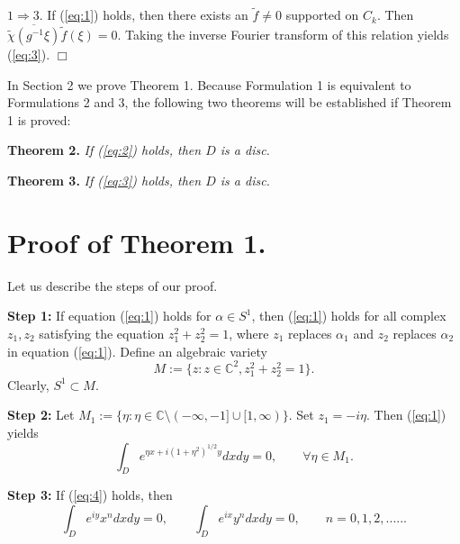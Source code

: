 \documentclass[final,11pt]{article}
\def\C{\mathbb{C}}
\begin{document}
$1\Rightarrow 3.$ If (\ref{eq:1}) holds, then there exists an
$\tilde{f}\neq 0$ supported on $C_k$. Then
$\overline{\tilde{\chi}(g^{-1}\xi)}\tilde{f}(\xi)=0$. Taking the inverse
Fourier transform of this relation yields (\ref{eq:3}). \hfill $\Box$


In Section 2 we prove Theorem 1.
Because Formulation 1 is equivalent to Formulations 2 and 3,
the following two theorems will be established if Theorem 1 is proved:

{\bf Theorem 2.} {\it If (\ref{eq:2}) holds, then $D$ is a disc.}

{\bf Theorem 3.} {\it If (\ref{eq:3}) holds, then $D$ is a disc.}

\section{Proof of Theorem 1.}

Let us describe the steps of our proof.

{\bf Step 1:}  If equation (\ref{eq:1}) holds for $\alpha \in S^1$,
then (\ref{eq:1}) holds for
all complex $z_1,z_2$ satisfying the equation $z_1^2+z_2^2=1$,
where $z_1$ replaces $\alpha_1$ and $z_2$ replaces $\alpha_2$ in equation (\ref{eq:1}).
Define an algebraic variety $$M:=\{z: z\in \C^2, z_1^2+z_2^2=1\}.$$
Clearly, $S^1\subset M$.

{\bf Step 2:}  Let $M_1:=\{\eta: \eta\in \mathbb{C}\setminus (-\infty,-1]\cup [1,\infty) \}$.
Set $z_1=-i\eta$. Then (\ref{eq:1}) yields
\begin{equation}\label{eq:4}
\int_D e^{\eta x+i(1+\eta^2)^{1/2}y}dxdy=0, \qquad \forall \eta\in M_1.
\end{equation}

{\bf Step 3:} If  (\ref{eq:4}) holds, then
\begin{equation}\label{eq:5}
\int_D e^{iy}x^ndxdy=0, \qquad \int_D e^{ix}y^ndxdy=0, \qquad n=0,1,2,......
\end{equation}
\end{document}

